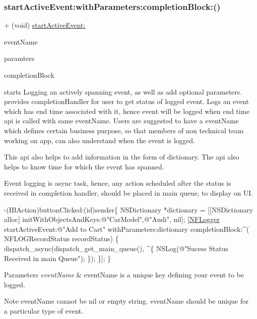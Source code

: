 \subsubsection{\texorpdfstring{start\+Active\+Event\+:with\+Parameters\+:completion\+Block\+:()}{startActiveEvent:withParameters:completionBlock:()}}
{\footnotesize\ttfamily + (void) \hyperlink{interface_n_f_logger_a2d98749d91d892500fab101747d06a71}{start\+Active\+Event\+:} \begin{DoxyParamCaption}\item[{(N\+S\+String $\ast$)}]{event\+Name }\item[{withParameters:(N\+S\+Dictionary $\ast$)}]{paramters }\item[{completionBlock:(void($^\wedge$)(N\+F\+L\+O\+G\+Record\+Status record\+Status))}]{completion\+Block }\end{DoxyParamCaption}}



starts Logging an actively spanning event, as well as add optional parameters. provides completion\+Handler for user to get status of logged event. Logs an event which has end time associated with it, hence event will be logged when end time api is called with same event\+Name. Users are suggested to have a event\+Name which defines certain business purpose, so that members of non technical team working on app, can also understand when the event is logged. 

This api also helps to add information in the form of dictionary. The api also helps to know time for which the event has spanned.

Event logging is async task, hence, any action scheduled after the status is received in completion handler, should be placed in main queue, to display on UI.


\begin{DoxyCode}
-(IBAction)buttonClicked:(\textcolor{keywordtype}{id})sender\{
 NSDictionary *dictionary = [[NSDictionary alloc] initWithObjectsAndKeys:\textcolor{stringliteral}{@"CarModel"},\textcolor{stringliteral}{@"Audi"}, nil];
 [\hyperlink{interface_n_f_logger}{NFLogger} startActiveEvent:\textcolor{stringliteral}{@"Add to Cart"} withParameters:dictionary completionBlock:^(
      NFLOGRecordStatus recordStatus) \{
      dispatch\_async(dispatch\_get\_main\_queue(), ^\{
          NSLog(\textcolor{stringliteral}{@"Sucess Status Received in main Queue"});
       \});
  \}];
\}
\end{DoxyCode}
 
\begin{DoxyParams}{Parameters}
{\em event\+Name} & event\+Name is a unique key defining your event to be logged. \\
\hline
\end{DoxyParams}
\begin{DoxyNote}{Note}
event\+Name cannot be nil or empty string. event\+Name should be unique for a particular type of event. 
\end{DoxyNote}

